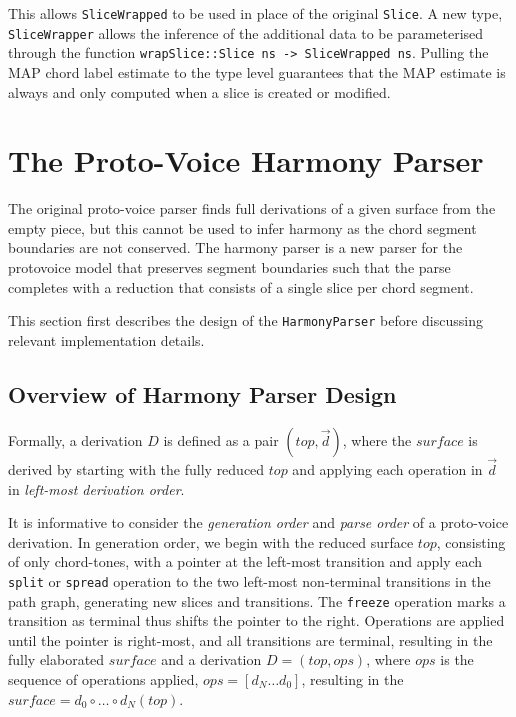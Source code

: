 \documentclass[12pt,a4paper,twoside,openany]{report} \usepackage[pdfborder={0 0 0}]{hyperref}    %
\theoremstyle{definition} \newtheorem{definition}{Definition}[section]
\begin{document}
    This allows \texttt{SliceWrapped} to be used in place of the original \texttt{Slice}. A new type,
    \texttt{SliceWrapper} allows the inference of the additional data to be parameterised through the function
    \texttt{wrapSlice::Slice ns -> SliceWrapped ns}. Pulling the MAP chord label estimate to the type level guarantees that
    the MAP estimate is always and only computed when a slice is created or modified.

      \section{The Proto-Voice Harmony Parser}
      \label{sec:protovoiceHarmonyParser}
      The original proto-voice parser finds full derivations of a given surface from the empty piece, but this cannot be
      used to infer harmony as the chord segment boundaries are not conserved. The harmony parser is a new parser for
      the protovoice model that preserves segment boundaries such that the parse completes with a reduction that
      consists of a single slice per chord segment.

      This section first describes the design of the \texttt{HarmonyParser} before discussing relevant
      implementation details. 

      \subsection{Overview of Harmony Parser Design}

      Formally, a derivation $D$ is defined as a pair $(top, \vec{d})$, where the $surface$ is derived by starting
      with the fully reduced $top$ and applying each operation in $\vec{d}$ in \textit{left-most derivation order}. 

      It is informative to consider the \textit{generation order} and \textit{parse order} of a proto-voice derivation.
      In generation order, we begin with the reduced surface $top$, consisting of only chord-tones, with a pointer at
      the left-most transition and apply each \texttt{split} or \texttt{spread} operation to the two left-most
      non-terminal transitions in the path graph, generating new slices and transitions. The \texttt{freeze} operation
      marks a transition as terminal thus shifts the pointer to the right. Operations are applied until the pointer is
      right-most, and all transitions are terminal, resulting in the fully elaborated $surface$ and a derivation
      $D=(top, ops)$, where $ops$ is the sequence of operations applied, $ops = [d_N \dots d_0]$, resulting in the
      $surface = d_0 \circ \dots \circ d_N (top) $.
\end{document}
